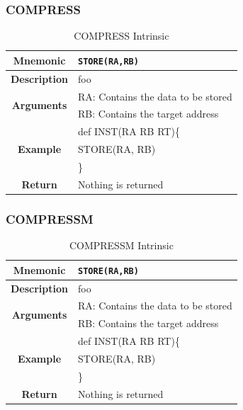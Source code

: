 \documentclass{article}
\begin{document}
\clearpage
\subsubsection{COMPRESS}
\label{sec:COMPRESS}

\begin{table}[h]
\begin{center}
\caption{COMPRESS Intrinsic}
\vspace{0.125in}
\label{tab:COMPRESSIntrinsic}
\begin{tabular}{|c|l|}
\hline
\textbf{Mnemonic} & \texttt{STORE(RA,RB)}\\
\hline
\textbf{Description} & foo\\
\hline
\multirow{2}{*}{\textbf{Arguments}} & RA: Contains the data to be stored\\
                          			     & RB: Contains the target address \\
\hline
\multirow{3}{*}{\textbf{Example}} & def INST(RA RB RT)\{\\
                          			  &   STORE(RA, RB)\\
                                                    & \}\\
\hline
\textbf{Return} & Nothing is returned\\                                                    
\hline
\end{tabular}
\end{center}
\end{table}

\clearpage
\subsubsection{COMPRESSM}
\label{sec:COMPRESSM}

\begin{table}[h]
\begin{center}
\caption{COMPRESSM Intrinsic}
\vspace{0.125in}
\label{tab:COMPRESSMIntrinsic}
\begin{tabular}{|c|l|}
\hline
\textbf{Mnemonic} & \texttt{STORE(RA,RB)}\\
\hline
\textbf{Description} & foo\\
\hline
\multirow{2}{*}{\textbf{Arguments}} & RA: Contains the data to be stored\\
                          			     & RB: Contains the target address \\
\hline
\multirow{3}{*}{\textbf{Example}} & def INST(RA RB RT)\{\\
                          			  &   STORE(RA, RB)\\
                                                    & \}\\
\hline
\textbf{Return} & Nothing is returned\\                                                    
\hline
\end{tabular}
\end{center}
\end{table}
\end{document}
